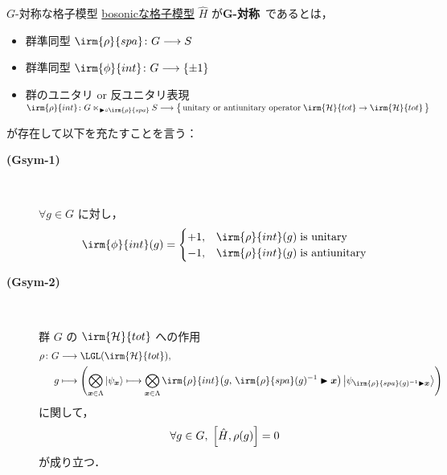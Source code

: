 \documentclass[TQFT_main]{subfiles}
\begin{document}
\begin{mydef}[label=def:blat-G-equiv]{$G$-対称な格子模型}
    \hyperref[def:bosonic-lattice-model]{bosonicな格子模型} $\hat{H}$ が\textbf{$\bm{G}$-対称}~\cite[p.12]{Xiong2019SPT}であるとは，
    \begin{itemize}
        \item 群準同型 $\irm{\rho}{spa} \colon G \lto S$
        \item 群準同型 $\irm{\phi}{int} \colon G \lto \{\pm 1\}$
        \item 群のユニタリ or 反ユニタリ表現 $\irm{\rho}{int} \colon G \ltimes_{\btr \circ \irm{\rho}{spa}} S \lto \bigl\{\, \text{unitary or antiunitary operator}\; \irm{\mathcal{H}}{tot} \to \irm{\mathcal{H}}{tot} \,\bigr\} $
    \end{itemize}
    が存在して以下を充たすことを言う：
    \begin{description}
        \item[\textbf{(Gsym-1)}]　
        
        $\forall g \in G$ に対し，
        \begin{align}
            \irm{\phi}{int} (g)
            = 
            \begin{cases}
                +1, &\irm{\rho}{int}(g)\; \text{is unitary} \\
                -1, &\irm{\rho}{int}(g)\; \text{is antiunitary}
            \end{cases}
        \end{align}
        
        \item[\textbf{(Gsym-2)}]　
        
        群 $G$ の $\irm{\mathcal{H}}{tot}$ への作用
        \begin{align}
            \rho \colon G &\lto \LGL (\irm{\mathcal{H}}{tot}), \\
            g &\lmto \left( \bigotimes_{\bm{x} \in \Lambda} \ket{\psi_{\bm{x}}} \lmto \bigotimes_{\bm{x} \in \Lambda} \irm{\rho}{int} \bigl( g,\, \irm{\rho}{spa}(g)^{-1} \btr \bm{x} \bigr) \ket{\psi_{\irm{\rho}{spa}(g)^{-1} \btr \bm{x}}}\right) 
        \end{align}
        に関して，
        \begin{align}
            \forall g \in G,\; \comm{\hat{H}}{\rho(g)} = 0
        \end{align}
        が成り立つ．
    \end{description}
    
\end{mydef}
\end{document}
